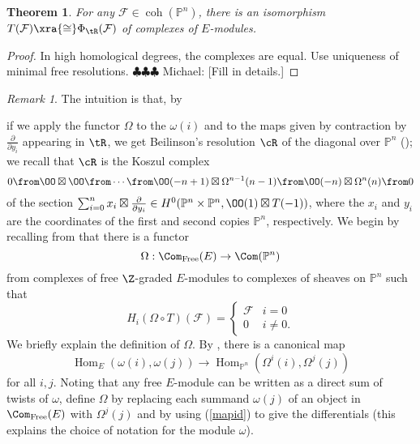 \documentclass[12pt]{amsart}
\newtheorem{thm}[lemma]{Theorem}
\theoremstyle{definition}
\theoremstyle{remark}
\newtheorem{rem}[lemma]{Remark}
\newcommand{\PP}{\mathbb P}
\newcommand{\Hom}{\operatorname{Hom}} %
\newcommand{\F}{\FF}
\newcommand{\michael}[1]{{\color{red} \sf $\clubsuit\clubsuit\clubsuit$ Michael: [#1]}}
\def\on{\operatorname}
\def\om{\omega}
\def\F{\mathcal{F}}
\def\om{\omega}
\begin{document}
\begin{thm}
For any $\F \in \on{coh}(\PP^n)$, there is an isomorphism $T(\F) \xra{\cong} \Phi_{\tR}(\F)$ of complexes of $E$-modules.
\end{thm}

\begin{proof}
In high homological degrees, the complexes are equal. Use uniqueness of minimal free resolutions. \michael{Fill in details.}
\end{proof}

\begin{rem}
The intuition is that, by 

if we apply the functor $\Omega$ to the $\om(i)$ and to the maps given by contraction by $\frac{\partial}{\partial y_i}$ appearing in $\tR$, we get Beilinson's resolution $\cR$ of the diagonal over $\PP^n$ (\cite{beilinson}); we recall that $\cR$ is the Koszul complex
$$
0 \from \OO \boxtimes \OO \from \cdots \from \OO(-n + 1) \boxtimes \Omega^{n-1}(n-1) \from \OO(-n) \boxtimes \Omega^n(n) \from 0
$$
of the section $\sum_{i = 0}^n x_i \boxtimes \frac{\partial}{\partial y_i} \in H^0(\PP^n \times \PP^n, \OO(1) \boxtimes T(-1))$, where the $x_i$ and $y_i$ are the coordinates of the first and second copies $\PP^n$, respectively. 
We begin by recalling from \cite[Section 6]{EFS} that there is a functor
\begin{equation}
\label{geobgg}
\Omega: \Com_{\on{Free}}(E) \to \Com(\PP^n)
\end{equation}
from complexes of free $\Z$-graded $E$-modules to complexes of sheaves on $\PP^n$ such that
$$
H_i(\Omega \circ T)(\F) = \begin{cases} \F & i = 0 \\ 0 & i \ne 0. \end{cases}
$$
We briefly explain the definition of $\Omega$. By \cite[Proposition 5.6]{EFS}, there is a canonical map
\begin{equation}
\label{mapid}
\Hom_E(\om(i), \om(j)) \to \Hom_{\PP^n}(\Omega^i(i), \Omega^j(j))
\end{equation}
for all $i, j$. Noting that any free $E$-module can be written as a direct sum of twists of $\om$, define $\Omega$ by 
replacing each summand $\om(j)$ of an object in $\Com_{\on{Free}}(E)$ with $\Omega^j(j)$ and by using (\ref{mapid}) to give the differentials (this explains the choice of notation for the module $\om$). 

\end{rem}
\end{document}
